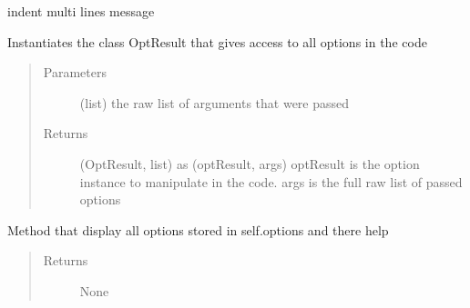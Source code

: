\documentclass[a4paper,10pt,english]{sphinxmanual}
\begin{document}
\begin{fulllineitems}
\begin{fulllineitems}
\begin{quote}
\begin{description}
\end{description}\end{quote}

\end{fulllineitems}


\begin{fulllineitems}
\label{\detokenize{commands/apidoc/src:src.options.Options.indent}}
indent multi lines message

\end{fulllineitems}


\begin{fulllineitems}
\label{\detokenize{commands/apidoc/src:src.options.Options.parse_args}}
Instantiates the class OptResult 
that gives access to all options in the code
\begin{quote}\begin{description}
\item[{Parameters}] \leavevmode
{} \textendash{} (list) the raw list of arguments that were passed

\item[{Returns}] \leavevmode
(OptResult, list) as (optResult, args) 
optResult is the option instance to manipulate in the code. 
args is the full raw list of passed options

\end{description}\end{quote}

\end{fulllineitems}


\begin{fulllineitems}
\label{\detokenize{commands/apidoc/src:src.options.Options.print_help}}
Method that display all options stored in self.options and there help
\begin{quote}\begin{description}
\item[{Returns}] \leavevmode
None

\end{description}\end{quote}

\end{fulllineitems}


\end{fulllineitems}
\end{document}
